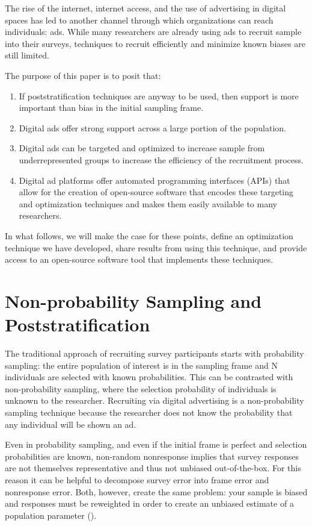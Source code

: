 \documentclass[a4paper,12pt]{article}
\theoremstyle{proposition}
\begin{document}
The rise of the internet, internet access, and the use of advertising in digital spaces has led to another channel through which organizations can reach individuals: ads. While many researchers are already using ads to recruit sample into their surveys, techniques to recruit efficiently and minimize known biases are still limited.

The purpose of this paper is to posit that:

\begin{enumerate}
\item If poststratification techniques are anyway to be used, then support is more important than bias in the initial sampling frame.
\item Digital ads offer strong support across a large portion of the population.
\item Digital ads can be targeted and optimized to increase sample from underrepresented groups to increase the efficiency of the recruitment process.
\item Digital ad platforms offer automated programming interfaces (APIs) that allow for the creation of open-source software that encodes these targeting and optimization techniques and makes them easily available to many researchers.
\end{enumerate}

In what follows, we will make the case for these points, define an optimization technique we have developed, share results from using this technique, and provide access to an open-source software tool that implements these techniques.


\section{Non-probability Sampling and Poststratification}


The traditional approach of recruiting survey participants starts with probability sampling: the entire population of interest is in the sampling frame and N individuals are selected with known probabilities. This can be contrasted with non-probability sampling, where the selection probability of individuals is unknown to the researcher. Recruiting via digital advertising is a non-probability sampling technique because the researcher does not know the probability that any individual will be shown an ad.

Even in probability sampling, and even if the initial frame is perfect and selection probabilities are known, non-random nonresponse implies that survey responses are not themselves representative and thus not unbiased out-of-the-box. For this reason it can be helpful to decompose survey error into frame error and nonresponse error. Both, however, create the same problem: your sample is biased and responses must be reweighted in order to create an unbiased estimate of a population parameter (\cite{Kolenikov2016}).
\end{document}
